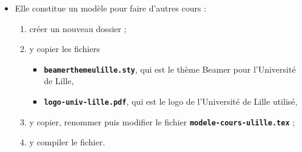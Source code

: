   \begin{itemize}
  \item Elle constitue un modèle pour faire d'autres cours :
      
    \begin{enumerate}
    \item créer un nouveau dossier ;
    \item y copier les fichiers 
      
      \begin{itemize}
      \item \texttt{\textbf{beamerthemeulille.sty}}, qui est le thème Beamer pour l'Université de Lille,
      \item \texttt{\textbf{logo-univ-lille.pdf}}, qui est le logo de l'Université de Lille utilisé,
      \end{itemize}
      
    \item y copier, renommer puis modifier le fichier \texttt{\textbf{modele-cours-ulille.tex}} ;
    \item y compiler le fichier.
    \end{enumerate}
  \end{itemize}
